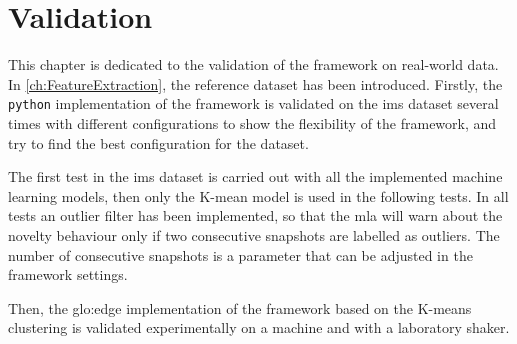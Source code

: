 \chapter{Validation}
\label{sec:Validation}

This chapter is dedicated to the validation of the framework on real-world data. In \autoref{ch:FeatureExtraction}, the reference dataset \cite{lee2007bearingdataset} has been introduced. Firstly, the \texttt{python} implementation of the framework is validated on the \gls{ims} dataset several times with different configurations to show the flexibility of the framework, and try to find the best configuration for the dataset. 

The first test in the \gls{ims} dataset is carried out with all the implemented machine learning models, then only the K-mean model is used in the following tests. In all tests an outlier filter has been implemented, so that the \gls{mla} will warn about the novelty behaviour only if two consecutive snapshots are labelled as outliers. The number of consecutive snapshots is a parameter that can be adjusted in the framework settings.

Then, the \gls{glo:edge} implementation of the framework based on the K-means clustering is validated experimentally on a machine and with a laboratory shaker.









